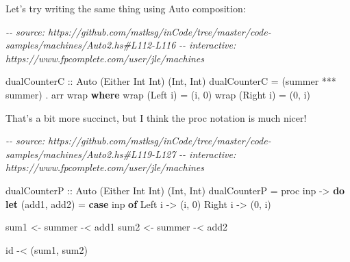\documentclass[]{article}
\newenvironment{Shaded}{}{}
\newcommand{\CommentTok}[1]{\textcolor[rgb]{0.38,0.63,0.69}{\textit{#1}}}
\newcommand{\DataTypeTok}[1]{\textcolor[rgb]{0.56,0.13,0.00}{#1}}
\newcommand{\DecValTok}[1]{\textcolor[rgb]{0.25,0.63,0.44}{#1}}
\newcommand{\FunctionTok}[1]{\textcolor[rgb]{0.02,0.16,0.49}{#1}}
\newcommand{\KeywordTok}[1]{\textcolor[rgb]{0.00,0.44,0.13}{\textbf{#1}}}
\newcommand{\NormalTok}[1]{#1}
\newcommand{\OperatorTok}[1]{\textcolor[rgb]{0.40,0.40,0.40}{#1}}
\newcommand{\OtherTok}[1]{\textcolor[rgb]{0.00,0.44,0.13}{#1}}
\begin{document}
Let's try writing the same thing using Auto composition:

\begin{Shaded}
\begin{Highlighting}[]
\CommentTok{{-}{-} source: https://github.com/mstksg/inCode/tree/master/code{-}samples/machines/Auto2.hs\#L112{-}L116}
\CommentTok{{-}{-} interactive: https://www.fpcomplete.com/user/jle/machines}

\OtherTok{dualCounterC ::} \DataTypeTok{Auto}\NormalTok{ (}\DataTypeTok{Either} \DataTypeTok{Int} \DataTypeTok{Int}\NormalTok{) (}\DataTypeTok{Int}\NormalTok{, }\DataTypeTok{Int}\NormalTok{)}
\NormalTok{dualCounterC }\OtherTok{=}\NormalTok{ (summer }\OperatorTok{***}\NormalTok{ summer) }\OperatorTok{.}\NormalTok{ arr wrap}
  \KeywordTok{where}
\NormalTok{    wrap (}\DataTypeTok{Left}\NormalTok{ i)  }\OtherTok{=}\NormalTok{ (i, }\DecValTok{0}\NormalTok{)}
\NormalTok{    wrap (}\DataTypeTok{Right}\NormalTok{ i) }\OtherTok{=}\NormalTok{ (}\DecValTok{0}\NormalTok{, i)}
\end{Highlighting}
\end{Shaded}

That's a bit more succinct, but I think the proc notation is much nicer!

\begin{Shaded}
\begin{Highlighting}[]
\CommentTok{{-}{-} source: https://github.com/mstksg/inCode/tree/master/code{-}samples/machines/Auto2.hs\#L119{-}L127}
\CommentTok{{-}{-} interactive: https://www.fpcomplete.com/user/jle/machines}

\OtherTok{dualCounterP ::} \DataTypeTok{Auto}\NormalTok{ (}\DataTypeTok{Either} \DataTypeTok{Int} \DataTypeTok{Int}\NormalTok{) (}\DataTypeTok{Int}\NormalTok{, }\DataTypeTok{Int}\NormalTok{)}
\NormalTok{dualCounterP }\OtherTok{=}\NormalTok{ proc inp }\OtherTok{{-}>} \KeywordTok{do}
    \KeywordTok{let}\NormalTok{ (add1, add2) }\OtherTok{=} \KeywordTok{case}\NormalTok{ inp }\KeywordTok{of} \DataTypeTok{Left}\NormalTok{ i  }\OtherTok{{-}>}\NormalTok{ (i, }\DecValTok{0}\NormalTok{)}
                                   \DataTypeTok{Right}\NormalTok{ i }\OtherTok{{-}>}\NormalTok{ (}\DecValTok{0}\NormalTok{, i)}

\NormalTok{    sum1 }\OtherTok{<{-}}\NormalTok{ summer }\OperatorTok{{-}<}\NormalTok{ add1}
\NormalTok{    sum2 }\OtherTok{<{-}}\NormalTok{ summer }\OperatorTok{{-}<}\NormalTok{ add2}

    \FunctionTok{id} \OperatorTok{{-}<}\NormalTok{ (sum1, sum2)}
\end{Highlighting}
\end{Shaded}
\end{document}
